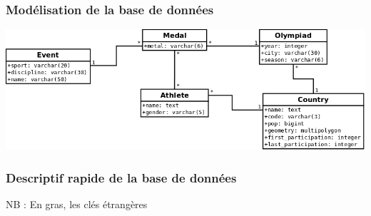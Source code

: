 \documentclass{article}
\begin{document}
\subsubsection{Modélisation de la base de données}

\includegraphics[width=\textwidth]{bdd.png}

\newpage

\subsubsection{Descriptif rapide de la base de données}

{\footnotesize NB : En gras, les clés étrangères}
\end{document}
